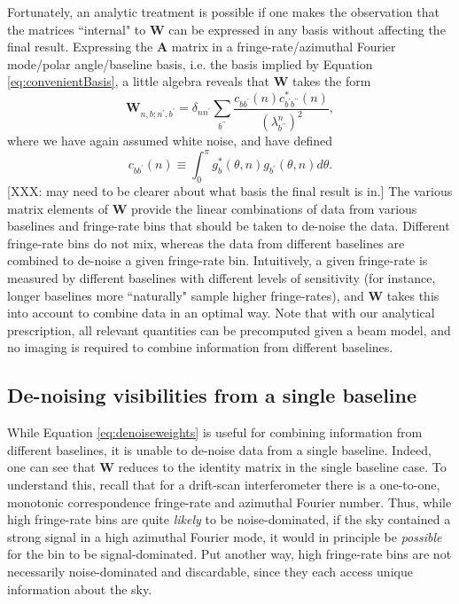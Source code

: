 \documentclass[twocolumn,apj,numberedappendix]{emulateapj}
\newcommand{\A}{\mathbf{A}}
\begin{document}
Fortunately, an analytic treatment is possible if one makes the observation that the matrices ``internal" to $\mathbf{W}$ can be expressed in any basis without affecting the final result.  Expressing the $\A$ matrix in a fringe-rate/azimuthal Fourier mode/polar angle/baseline basis, i.e. the basis implied by Equation \eqref{eq:convenientBasis}, a little algebra reveals that $\mathbf{W}$ takes the form
\begin{equation}
\label{eq:denoiseweights}
\mathbf{W}_{n,b; n^\prime\!,b^\prime} = \delta_{nn^\prime}\sum_{b^{\prime\prime}} \frac{c_{bb^\prime}(n) c^*_{b^\prime b^{\prime\prime}}(n)}{(\lambda_{b^{\prime \prime}}^n )^2},
\end{equation}
where we have again assumed white noise, and have defined
\begin{equation}
c_{bb^\prime}(n) \equiv  \int_0^\pi  g_b^*(\theta,n) g_{b^{\prime}}(\theta,n) d\theta.
\end{equation}
[XXX: may need to be clearer about what basis the final result is in.]  The various matrix elements of $\mathbf{W}$ provide the linear combinations of data from various baselines and fringe-rate bins that should be taken to de-noise the data.  Different fringe-rate bins do not mix, whereas the data from different baselines are combined to de-noise a given fringe-rate bin.  Intuitively, a given fringe-rate is measured by different baselines with different levels of sensitivity (for instance, longer baselines more ``naturally" sample higher fringe-rates), and $\mathbf{W}$ takes this into account to combine data in an optimal way.  Note that with our analytical prescription, all relevant quantities can be precomputed given a beam model, and no imaging is required to combine information from different baselines.

\subsection{De-noising visibilities from a single baseline}

While Equation \eqref{eq:denoiseweights} is useful for combining information from different baselines, it is unable to de-noise data from a single baseline.  Indeed, one can see that $\mathbf{W}$ reduces to the identity matrix in the single baseline case.  To understand this, recall that for a drift-scan interferometer there is a one-to-one, monotonic correspondence fringe-rate and azimuthal Fourier number.  Thus, while high fringe-rate bins are quite \emph{likely} to be noise-dominated, if the sky contained a strong signal in a high azimuthal Fourier mode, it would in principle be \emph{possible} for the bin to be signal-dominated.  Put another way, high fringe-rate bins are not necessarily noise-dominated and discardable, since they each access unique information about the sky.
\end{document}
